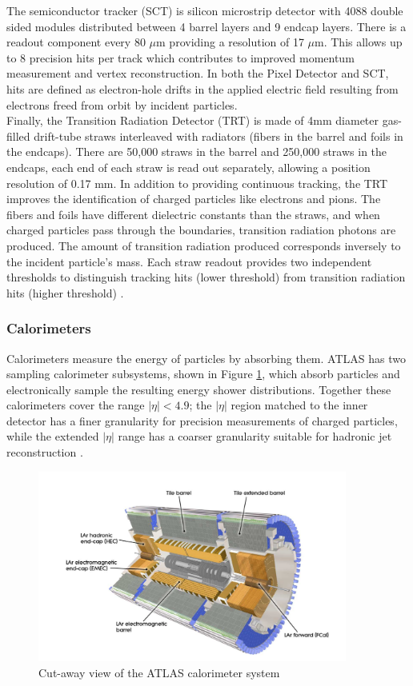 The semiconductor tracker (SCT) is silicon microstrip detector with 4088 double sided modules distributed between 4 barrel layers and 9 endcap layers. There is a readout component every 80 $\mu$m providing a resolution of 17 $\mu$m. This allows up to 8 precision hits per track which contributes to improved momentum measurement and vertex reconstruction. In both the Pixel Detector and SCT, hits are defined as electron-hole drifts in the applied electric field resulting from electrons freed from orbit by incident particles.\\

Finally, the Transition Radiation Detector (TRT) is made of 4mm diameter gas-filled drift-tube straws interleaved with radiators (fibers in the barrel and foils in the endcaps). There are 50,000 straws in the barrel and 250,000 straws in the endcaps, each end of each straw is read out separately, allowing a position resolution of 0.17 mm. In addition to providing continuous tracking, the TRT improves the identification of charged particles like electrons and pions. The fibers and foils have different dielectric constants than the straws, and when charged particles pass through the boundaries, transition radiation photons are produced. The amount of transition radiation produced corresponds inversely to the incident particle's mass. Each straw readout provides two independent thresholds to distinguish tracking hits (lower threshold) from transition radiation hits (higher threshold) \cite{trt}.


\subsubsection{Calorimeters}
Calorimeters measure the energy of particles by absorbing them. ATLAS has two sampling calorimeter subsystems, shown in Figure  \ref{fig:calos}, which absorb particles and electronically sample the resulting energy shower distributions. Together these calorimeters cover the range $|\eta|<4.9$; the $|\eta|$ region matched to the inner detector has a finer granularity for precision measurements of charged particles, while the extended $|\eta|$ range has a coarser granularity suitable for hadronic jet reconstruction \cite{atlas}.\\

\begin{figure}[htb!]
    \centering
    \includegraphics[width=4in]{figures/chapter2/calos.png}
    \caption{Cut-away view of the ATLAS calorimeter system \cite{atlas}}
    \label{fig:calos}
\end{figure}


